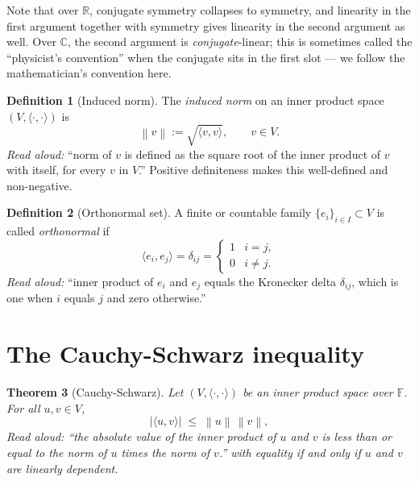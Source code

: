 \documentclass[11pt]{article}
\newtheorem{theorem}{Theorem}
\theoremstyle{definition}
\newtheorem{definition}[theorem]{Definition}
\newcommand{\inner}[2]{\langle #1, #2 \rangle}
\newcommand{\norm}[1]{\left\| #1 \right\|}
\newcommand{\R}{\mathbb{R}}
\newcommand{\C}{\mathbb{C}}
\newcommand{\F}{\mathbb{F}}
\begin{document}
Note that over $\R$, conjugate symmetry collapses to symmetry, and
linearity in the first argument together with symmetry gives linearity
in the second argument as well. Over $\C$, the second argument is
\emph{conjugate}-linear; this is sometimes called the ``physicist's
convention'' when the conjugate sits in the first slot --- we follow
the mathematician's convention here.

\begin{definition}[Induced norm]
The \emph{induced norm} on an inner product space $(V, \inner{\cdot}{\cdot})$ is
$$\norm{v} := \sqrt{\inner{v}{v}}, \qquad v \in V.$$
\emph{Read aloud:} ``norm of $v$ is defined as the square root of the inner product of $v$ with itself, for every $v$ in $V$.''
Positive definiteness makes this well-defined and non-negative.
\end{definition}

\begin{definition}[Orthonormal set]
A finite or countable family $\{e_i\}_{i \in I} \subset V$ is called
\emph{orthonormal} if
$$\inner{e_i}{e_j} = \delta_{ij}
  = \begin{cases} 1 & i = j, \\ 0 & i \neq j.\end{cases}$$
\emph{Read aloud:} ``inner product of $e_i$ and $e_j$ equals the Kronecker delta $\delta_{ij}$, which is one when $i$ equals $j$ and zero otherwise.''
\end{definition}

\section{The Cauchy-Schwarz inequality}

\begin{theorem}[Cauchy-Schwarz]
\label{thm:cs}
Let $(V, \inner{\cdot}{\cdot})$ be an inner product space over $\F$.
For all $u, v \in V$,
\begin{equation}
\label{eq:cs}
\bigl| \inner{u}{v} \bigr| \;\le\; \norm{u}\,\norm{v},
\end{equation}
\emph{Read aloud:} ``the absolute value of the inner product of $u$ and $v$ is less than or equal to the norm of $u$ times the norm of $v$.''
with equality if and only if $u$ and $v$ are linearly dependent.
\end{theorem}
\end{document}
